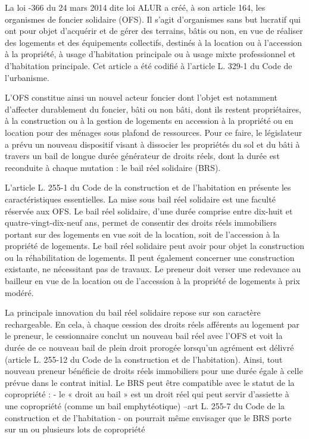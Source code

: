 			La loi -366 du 24 mars 2014 dite loi ALUR a créé, à son article 164, les organismes de foncier
			solidaire (OFS). Il s’agit d’organismes sans but lucratif qui ont pour objet d’acquérir et de gérer des terrains,
			bâtis ou non, en vue de réaliser des logements et des équipements collectifs, destinés à la location ou à
			l’accession à la propriété, à usage d’habitation principale ou à usage mixte professionnel et d’habitation
			principale. Cet article a été codifié à l’article L. 329-1 du Code de l’urbanisme.
			
			L’OFS constitue ainsi un nouvel acteur foncier dont l’objet est notamment d’affecter durablement du
			foncier, bâti ou non bâti, dont ils restent propriétaires, à la construction ou à la gestion de logements en
			accession à la propriété ou en location pour des ménages sous plafond de ressources.
			Pour ce faire, le législateur a prévu un nouveau dispositif visant à dissocier les propriétés du sol et du bâti
			à travers un bail de longue durée générateur de droits réels, dont la durée est reconduite à chaque
			mutation : le bail réel solidaire (BRS).
			
			L’article L. 255-1 du Code de la construction et de l’habitation en présente les caractéristiques essentielles.
			La mise sous bail réel solidaire est une faculté réservée aux OFS. Le bail réel solidaire, d’une durée comprise
			entre dix-huit et quatre-vingt-dix-neuf ans, permet de consentir des droits réels immobiliers portant sur
			des logements en vue soit de la location, soit de l’accession à la propriété de logements. Le bail réel
			solidaire peut avoir pour objet la construction ou la réhabilitation de logements. Il peut également
			concerner une construction existante, ne nécessitant pas de travaux. Le preneur doit verser une redevance
			au bailleur en vue de la location ou de l’accession à la propriété de logements à prix modéré.
			
			La principale innovation du bail réel solidaire repose sur son caractère rechargeable. En cela, à chaque
			cession des droits réels afférents au logement par le preneur, le cessionnaire conclut un nouveau bail réel
			avec l’OFS et voit la durée de ce nouveau bail de plein droit prorogée lorsqu’un agrément est délivré
			(article L. 255-12 du Code de la construction et de l’habitation). Ainsi, tout nouveau preneur bénéficie de
			droits réels immobiliers pour une durée égale à celle prévue dans le contrat initial.
			Le BRS peut être compatible avec le statut de la copropriété :
			- le « droit au bail » est un droit réel qui peut servir d’assiette à une copropriété (comme un bail
			emphytéotique) –art L. 255-7 du Code de la construction et de l’habitation
			- on pourrait même envisager que le BRS porte sur un ou plusieurs lots de copropriété
		
